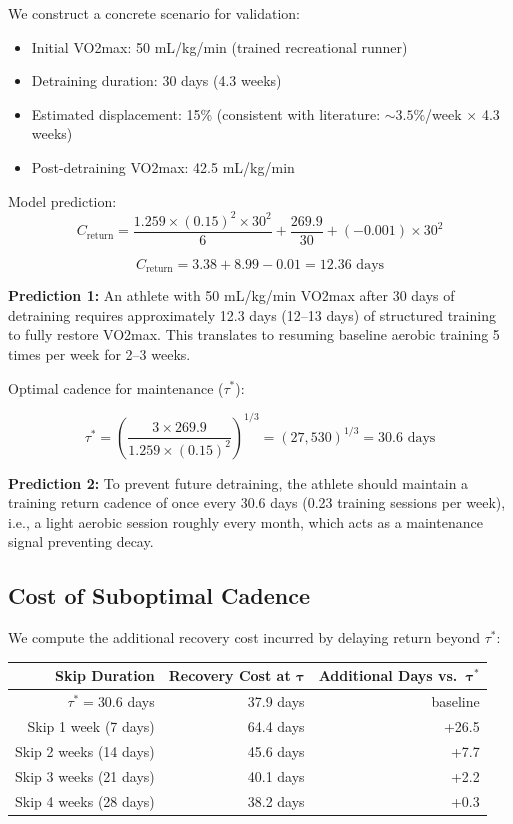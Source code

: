 \documentclass[12pt,a4paper]{article}
\begin{document}
We construct a concrete scenario for validation:

\begin{itemize}
\item Initial VO2max: 50 mL/kg/min (trained recreational runner)
\item Detraining duration: 30 days (4.3 weeks)
\item Estimated displacement: 15\% (consistent with literature: $\sim 3.5\%$/week $\times$ 4.3 weeks)
\item Post-detraining VO2max: 42.5 mL/kg/min
\end{itemize}

Model prediction:
\begin{equation}
C_{\text{return}} = \frac{1.259 \times (0.15)^2 \times 30^2}{6} + \frac{269.9}{30} + (-0.001) \times 30^2
\end{equation}

\begin{equation}
C_{\text{return}} = 3.38 + 8.99 - 0.01 = 12.36 \text{ days}
\end{equation}

\textbf{Prediction 1:} An athlete with 50 mL/kg/min VO2max after 30 days of detraining requires approximately 12.3 days (12--13 days) of structured training to fully restore VO2max. This translates to resuming baseline aerobic training 5 times per week for 2--3 weeks.

Optimal cadence for maintenance ($\tau^*$):

\begin{equation}
\tau^* = \left(\frac{3 \times 269.9}{1.259 \times (0.15)^2}\right)^{1/3} = (27,530)^{1/3} = 30.6 \text{ days}
\end{equation}

\textbf{Prediction 2:} To prevent future detraining, the athlete should maintain a training return cadence of once every 30.6 days (0.23 training sessions per week), i.e., a light aerobic session roughly every month, which acts as a maintenance signal preventing decay.

\subsection{Cost of Suboptimal Cadence}

We compute the additional recovery cost incurred by delaying return beyond $\tau^*$:

\begin{center}
\begin{tabular}{r r r}
\toprule
\textbf{Skip Duration} & \textbf{Recovery Cost at $\boldsymbol{\tau}$} & \textbf{Additional Days vs.~$\boldsymbol{\tau^*}$} \\
\midrule
$\tau^* = 30.6$ days & 37.9 days & baseline \\
Skip 1 week (7 days) & 64.4 days & +26.5 \\
Skip 2 weeks (14 days) & 45.6 days & +7.7 \\
Skip 3 weeks (21 days) & 40.1 days & +2.2 \\
Skip 4 weeks (28 days) & 38.2 days & +0.3 \\
\bottomrule
\end{tabular}
\end{center}
\end{document}
